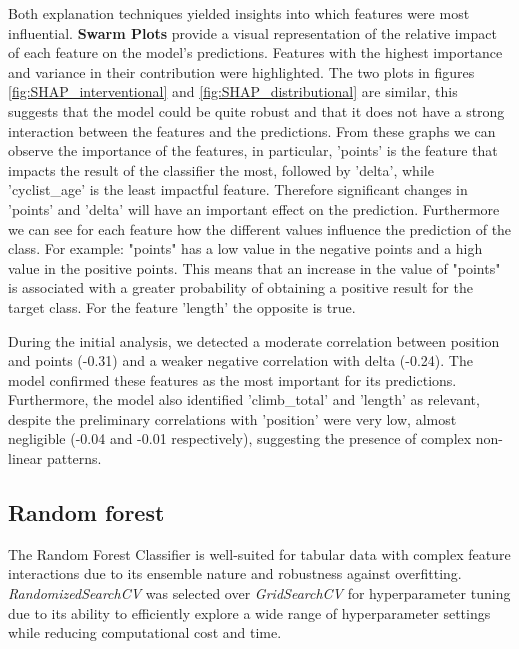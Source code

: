 \documentclass[a4paper, twoside]{article}
\begin{document}
Both explanation techniques yielded insights into which features were most influential. \textbf{Swarm Plots} provide a visual representation of the relative impact of each feature on the model's predictions. Features with the highest importance and variance in their contribution were highlighted.
The two plots in figures \ref{fig:SHAP_interventional} and \ref{fig:SHAP_distributional}  are similar, this suggests that the model could be quite robust and that it does not have a strong interaction between the features and the predictions. From these graphs we can observe the importance of the features, in particular, 'points' is the feature that impacts the result of the classifier the most, followed by 'delta', while 'cyclist\_age' is the least impactful feature. Therefore significant changes in 'points' and 'delta' will have an important effect on the prediction. Furthermore we can see for each feature how the different values influence the prediction of the class. For example: "points" has a low value in the negative points and a high value in the positive points. This means that an increase in the value of "points" is associated with a greater probability of obtaining a positive result for the target class. For the feature 'length' the opposite is true.

During the initial analysis, we detected a moderate correlation between position and points (-0.31) and a weaker negative correlation with delta (-0.24). The model confirmed these features as the most important for its predictions. Furthermore, the model also identified 'climb\_total' and 'length' as relevant, despite the preliminary correlations with 'position' were very low, almost negligible (-0.04 and -0.01 respectively), suggesting the presence of complex non-linear patterns.



\subsection{Random forest}
The Random Forest Classifier is well-suited for tabular data with complex feature interactions due to its ensemble nature and robustness against overfitting. \\

\textit{RandomizedSearchCV} was selected over \textit{GridSearchCV} for hyperparameter tuning due to its ability to efficiently explore a wide range of hyperparameter settings while reducing computational cost and time.
\end{document}
